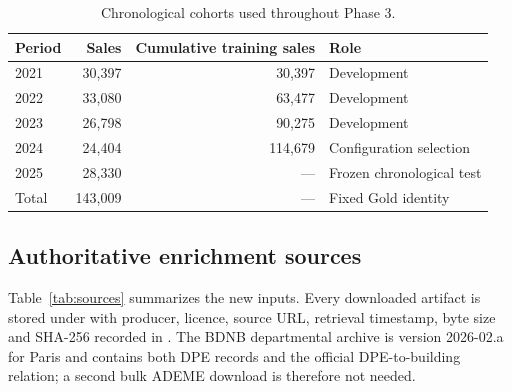 \documentclass[11pt,a4paper]{article}
\begin{document}
\begin{table}[H]
\centering
\caption{Chronological cohorts used throughout Phase 3.}
\label{tab:splits}
\begin{tabular}{lrrl}
\toprule
Period & Sales & Cumulative training sales & Role \\
\midrule
2021 & 30,397 & 30,397 & Development \\
2022 & 33,080 & 63,477 & Development \\
2023 & 26,798 & 90,275 & Development \\
2024 & 24,404 & 114,679 & Configuration selection \\
2025 & 28,330 & --- & Frozen chronological test \\
\midrule
Total & 143,009 & --- & Fixed Gold identity \\
\bottomrule
\end{tabular}
\end{table}

\subsection{Authoritative enrichment sources}

Table~\ref{tab:sources} summarizes the new inputs. Every downloaded artifact is
stored under  with producer, licence, source URL, retrieval
timestamp, byte size and SHA-256 recorded in
. The BDNB departmental archive is
version 2026-02.a for Paris and contains both DPE records and the official
DPE-to-building relation; a second bulk ADEME download is therefore not needed.
\end{document}
